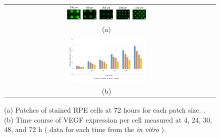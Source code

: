 
%
%
%







\begin{figure}
 \begin{center}
  \begin{tabular}{cc}
   \includegraphics[width=0.40\textwidth]{./figures/in_vitro_crop.png} \\
   (a)\\
    \includegraphics[width=0.40\textwidth]{./figures/Results/In-Vitro.png} \\
   (b)   
   \end{tabular}
   \end{center}

\caption{(a) Patches of stained RPE cells at 72 hours for each patch size. \cite{qanitabaker:Vargis2014Effect}. (b) Time course of VEGF expression per cell measured at 4, 24, 30, 48, and 72 h ( data for each time from the \textit{in vitro} \cite{qanitabaker:Vargis2014Effect} ). }
  \vspace{+1mm}
\label{in_vitro_experiment}
\end{figure}


